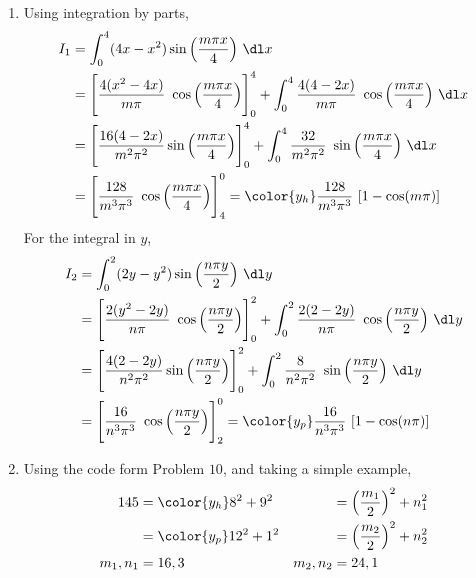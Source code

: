 \begin{enumerate}
    \item Using integration by parts,
          \begin{align}
              I_1 & = \int_{0}^{4} (4x - x^2) \sin \Big( \frac{m\pi x}{4} \Big)\ \dl x \\
                  & = \Bigg[\frac{4(x^2 - 4x)}{m\pi}\ \cos \Big( \frac{m\pi x}{4}
                  \Big)\Bigg]_0^4 + \int_{0}^{4} \frac{4(4 - 2x)}{m\pi}\ \cos \Big(
              \frac{m\pi x}{4} \Big) \ \dl x                                           \\
                  & = \Bigg[ \frac{16(4 - 2x)}{m^2\pi^2}
                  \sin \Big( \frac{m\pi x}{4} \Big) \Bigg]_0^4 + \int_{0}^{4}
              \frac{32}{m^2\pi^2}\ \sin\Big( \frac{m\pi x}{4} \Big)\ \dl x             \\
                  & = \Bigg[ \frac{128}{m^3\pi^3}\ \cos\Big( \frac{m\pi x}{4}
                  \Big)\Bigg]_4^0 = \color{y_h} \frac{128}{m^3\pi^3}\ [1 - \cos(m\pi)]
          \end{align}
          For the integral in $ y $,
          \begin{align}
              I_2 & = \int_{0}^{2} (2y - y^2) \sin \Big( \frac{n\pi y}{2} \Big)\ \dl y \\
                  & = \Bigg[\frac{2(y^2 - 2y)}{n\pi}\ \cos \Big( \frac{n\pi y}{2}
                  \Big)\Bigg]_0^2 + \int_{0}^{2} \frac{2(2 - 2y)}{n\pi}\ \cos \Big(
              \frac{n\pi y}{2} \Big) \ \dl y                                           \\
                  & = \Bigg[ \frac{4(2 - 2y)}{n^2\pi^2}
                  \sin \Big( \frac{n\pi y}{2} \Big) \Bigg]_0^2 + \int_{0}^{2}
              \frac{8}{n^2\pi^2}\ \sin\Big( \frac{n\pi y}{2} \Big)\ \dl y              \\
                  & = \Bigg[ \frac{16}{n^3\pi^3}\ \cos\Big( \frac{n\pi y}{2}
                  \Big)\Bigg]_2^0 = \color{y_p} \frac{16}{n^3\pi^3}\ [1 - \cos(n\pi)]
          \end{align}

    \item Using the code form Problem $ 10 $, and taking a simple example,
          \begin{align}
              145      & = \color{y_h} 8^2 + 9^2               &
                       & = \Bigl(\frac{m_1}{2}\Bigr)^2 + n_1^2   \\
                       & = \color{y_p} 12^2 + 1^2              &
                       & = \Bigl(\frac{m_2}{2}\Bigr)^2 + n_2^2   \\
              m_1, n_1 & = 16, 3                               &
              m_2, n_2 & = 24, 1
          \end{align}


\end{enumerate}

